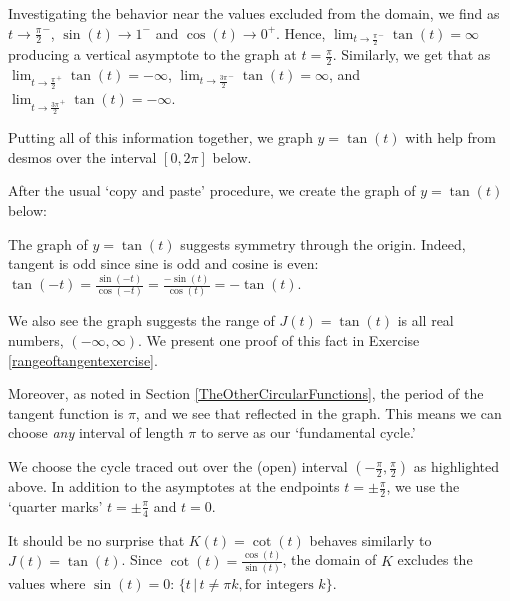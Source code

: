 \documentclass{ximera}
\begin{document}
Investigating the behavior near the values excluded from the domain, we find as $t \rightarrow \frac{\pi}{2}^{-}$, $\sin(t) \rightarrow 1^{-}$ and $\cos(t) \rightarrow 0^{+}$. Hence,   $\lim_{t \rightarrow \frac{\pi}{2}^{-}}\tan(t) = \infty$ producing a vertical asymptote to the graph at $t = \frac{\pi}{2}$.  Similarly, we get that as $\lim_{t \rightarrow \frac{\pi}{2}^{+}} \tan(t) = -\infty$,   $\lim_{t \rightarrow \frac{3\pi}{2}^{-}} \tan(t) = \infty$, and  $\lim_{t \rightarrow \frac{3\pi}{2}^{+}}\tan(t) = -\infty$.



Putting all of this information together, we graph $y = \tan(t)$ with help from desmos over the interval $[0, 2\pi]$ below.


\begin{center}
\end{center}

After the usual `copy and paste' procedure, we create the graph of $y = \tan(t)$ below: 

\begin{center}
\end{center}

The graph of $y = \tan(t)$ suggests symmetry through the origin.  Indeed, tangent is odd since sine is odd and cosine is even:   $\tan(-t) = \frac{\sin(-t)}{\cos(-t)} = \frac{-\sin(t)}{\cos(t)} = -\tan(t)$.  



We also see the graph suggests the range of $J(t) = \tan(t)$ is all real numbers, $(-\infty, \infty)$.  We present one proof of this fact in Exercise \ref{rangeoftangentexercise}.

Moreover, as noted in Section \ref{TheOtherCircularFunctions}, the period of the tangent function is $\pi$, and we see that reflected in the graph. This means we can choose \textit{any} interval of length $\pi$ to serve as our `fundamental cycle.'  


We choose the cycle traced out  over the (open) interval $\left( -\frac{\pi}{2}, \frac{\pi}{2} \right)$ as highlighted above.  In addition to the asymptotes at the endpoints $t = \pm \frac{\pi}{2}$, we use the `quarter marks' $t = \pm \frac{\pi}{4}$ and $t = 0$. 


It should be no surprise that $K(t) = \cot(t)$ behaves similarly to $J(t)=\tan(t)$.  Since $\cot(t) = \frac{\cos(t)}{\sin(t)}$, the domain of $K$ excludes the values where $\sin(t) = 0$:   $\{ t \, | \, t \neq  \pi k, \text{for integers $k$} \}$.
\end{document}
